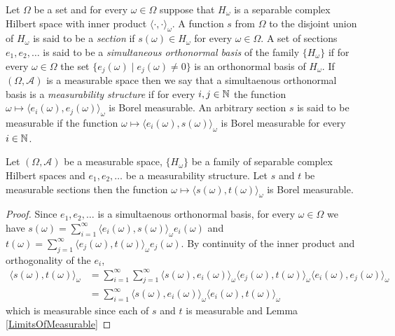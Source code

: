 \begin{defn}Let $\Omega$ be a set and for every $\omega \in \Omega$ suppose that $H_\omega$ is a separable complex Hilbert space with inner product $\langle \cdot, \cdot \rangle_\omega$.  A function $s$ from $\Omega$ to the disjoint union of $H_\omega$ is said to be a \emph{section} if $s(\omega) \in H_\omega$ for every $\omega \in \Omega$.  A set of sections $e_1, e_2, \dotsc$ is said to be a \emph{simultaneous orthonormal basis} of the family $\lbrace H_\omega \rbrace$ if for every $\omega \in \Omega$ the set $\lbrace e_j(\omega) \mid e_j(\omega) \neq 0 \rbrace$ is an orthonormal basis of $H_\omega$.  If $(\Omega, \mathcal{A})$ is a measurable space then we say that a simultaenous orthonormal basis is a \emph{measurability structure} if for every $i,j \in \mathbb{N}$ the function $\omega \mapsto \langle e_i(\omega), e_j(\omega) \rangle_\omega$ is Borel measurable.   An arbitrary section $s$ is said to be measurable if the function 
$\omega \mapsto \langle e_i(\omega), s(\omega) \rangle_\omega$ is Borel measurable for every $i \in \mathbb{N}$.
\end{defn}

\begin{prop}\label{hilbert:InnerProductOfMeasurableSections}Let $(\Omega, \mathcal{A})$ be a measurable space, $\lbrace H_\omega \rbrace$ be a family of separable complex Hilbert spaces and $e_1, e_2,\dotsc$ be a measurability structure.  Let $s$ and $t$ be measurable sections then the function $\omega \mapsto \langle s(\omega), t(\omega) \rangle_\omega$ is Borel measurable.
\end{prop}
\begin{proof}
Since $e_1, e_2, \dotsc$ is a simultaenous orthonormal basis, for every $\omega \in \Omega$  we have $s(\omega) = \sum_{i=1}^\infty \langle e_i(\omega), s(\omega) \rangle_\omega e_i(\omega)$ and $t(\omega) = \sum_{j=1}^\infty \langle e_j(\omega), t(\omega) \rangle_\omega e_j(\omega)$.  By continuity of the inner product and orthogonality of the $e_i$,
\begin{align*}
\langle s(\omega), t(\omega) \rangle_\omega 
&= \sum_{i=1}^\infty \sum_{j=1}^\infty \langle  s(\omega)  , e_i(\omega)\rangle_\omega \langle e_j(\omega), t(\omega) \rangle_\omega \langle e_i(\omega), e_j(\omega) \rangle_\omega \\
&=\sum_{i=1}^\infty  \langle s(\omega)  ,e_i(\omega)\rangle_\omega \langle e_i(\omega), t(\omega) \rangle_\omega 
\end{align*}
which is measurable since each of $s$ and $t$ is measurable and Lemma \ref{LimitsOfMeasurable}
\end{proof}

